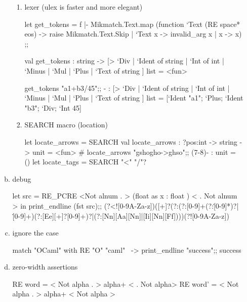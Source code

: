 \begin{enumerate}
\begin{enumerate}[(a)]
\begin{enumerate}
\item lexer (ulex is faster and more elegant)

  \begin{bluecode}
let get_tokens = f |- Mikmatch.Text.map (function `Text (RE space* eos)
-> raise Mikmatch.Text.Skip | `Text x -> invalid_arg x | x
-> x) ;;

val get_tokens :
  string ->
  [> `Div
   | `Ident of string
   | `Int of int
   | `Minus
   | `Mul
   | `Plus
   | `Text of string ]
  list = <fun>

get_tokens "a1+b3/45";;
- : [> `Div
     | `Ident of string
     | `Int of int
     | `Minus
     | `Mul
     | `Plus
     | `Text of string ]
    list
= [`Ident "a1"; `Plus; `Ident "b3"; `Div; `Int 45]  
\end{bluecode}

\item SEARCH macro (location)

  \begin{alternate}
let locate_arrows = SEARCH %
val locate_arrows : ?pos:int -> string -> unit = <fun>
# locate_arrows "gshogho->ghso";;
(7-8)- : unit = ()
let locate_tags = SEARCH "<" "/"? %
\end{alternate}

\end{enumerate}

\item debug 
  \begin{alternate}
let src = RE_PCRE <Not alnum . > (float as x : float ) < . Not alnum > in print_endline (fst src);;
(?<![0-9A-Za-z])([+\-]?(?:(?:[0-9]+(?:\.[0-9]*)?|\.[0-9]+)(?:[Ee][+\-]?[0-9]+)?|(?:[Nn][Aa][Nn]|[Ii][Nn][Ff])))(?![0-9A-Za-z])
\end{alternate}




\item ignore the case
  \begin{alternate}
match "OCaml" with RE "O" "caml"~ -> print_endline "success";;
success    
\end{alternate}


\item zero-width assertions

  \begin{bluecode}
RE word =  < Not alpha . >    alpha+ < . Not alpha>
RE word' = < Not alpha . >    alpha+ < Not alpha >
\end{bluecode}


\end{enumerate}
\end{enumerate}
